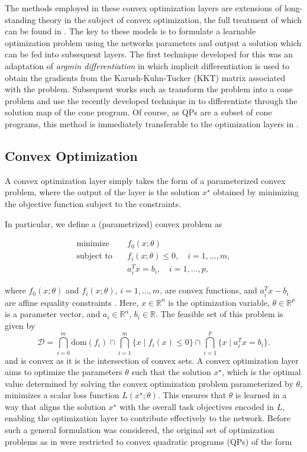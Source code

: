 \documentclass{article}
\begin{document}
The methods employed in these convex optimization layers are extensions of long-standing theory in the subject of convex optimization, the full treatment of which can be found in \citet{boyd2004convex}. The key to these models is to formulate a learnable optimization problem using the networks parameters and output a solution which can be fed into subsequent layers. The first technique developed for this was an adaptation of \textit{argmin differentiation} in which implicit differentiation is used to obtain the gradients from the Karush-Kuhn-Tucker (KKT) matrix associated with the problem. Subsequent works such as \citet{differentiableconvexoptimizationlayers} transform the problem into a cone problem and use the recently developed technique in \citet{conedifferentiation} to differentiate through the solution map of the cone program. Of course, as QPs are a subset of cone programs, this method is immediately transferable to the optimization layers in \citet{optnet}.

\subsection{Convex Optimization}

A convex optimization layer simply takes the form of a parameterized convex problem, where the output of the layer is the solution \(x^\star\) obtained by minimizing the objective function subject to the constraints.

In particular, we define a (parametrized) convex problem as

\begin{equation}
\begin{aligned}
    \text{minimize} \quad & f_0(x; \theta) \\
    \text{subject to} \quad & f_i(x; \theta) \leq 0, \quad i = 1, \ldots, m, \\
    & a_i^T x = b_i, \quad i = 1, \ldots, p,
\end{aligned}
\end{equation}

where $f_0(x; \theta)$ and $f_i(x; \theta)$, $i = 1, \ldots, m$, are convex functions, and $a_i^T x - b_i$ are affine equality constraints \citet{boyd2004convex}. Here, $x \in \mathbb{R}^n$ is the optimization variable, $\theta \in \mathbb{R}^p$ is a parameter vector, and $a_i \in \mathbb{R}^n$, $b_i \in \mathbb{R}$. The feasible set of this problem is given by \[\mathcal{D} = \bigcap_{i=0}^m \text{dom}(f_i) \cap \bigcap_{i=1}^m \{x \mid f_i(x) \leq 0\} \cap \bigcap_{i=1}^p \{x \mid a_i^T x = b_i\}.
\] and is convex as it is the intersection of convex sets. A convex optimization layer aims to optimize the parameters \(\theta\) such that the solution \(x^\star\), which is the optimal value determined by solving the convex optimization problem parameterized by \(\theta\), minimizes a scalar loss function \(L(x^\star; \theta)\). This ensures that \(\theta\) is learned in a way that aligns the solution \(x^\star\) with the overall task objectives encoded in \(L\), enabling the optimization layer to contribute effectively to the network. Before such a general formulation was considered, the original set of optimization problems as in \citet{optnet} were restricted to convex quadratic programs (QPs) of the form
\end{document}
